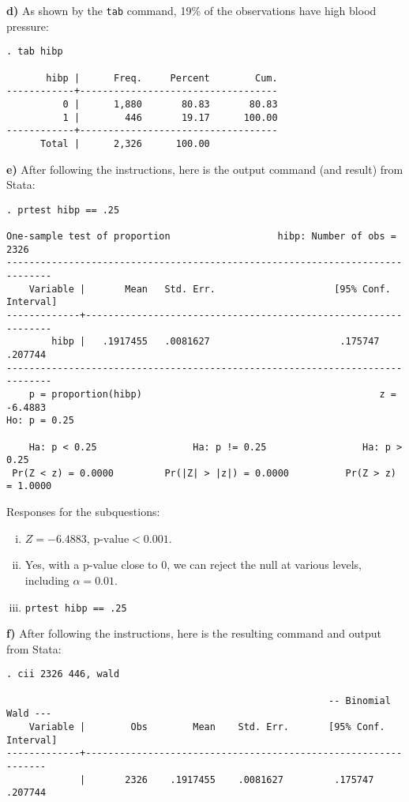 \documentclass{article}
\begin{document}
\textbf{d)} As shown by the \texttt{tab} command, 19\% of the observations have high blood pressure:

\begin{verbatim}
. tab hibp

       hibp |      Freq.     Percent        Cum.
------------+-----------------------------------
          0 |      1,880       80.83       80.83
          1 |        446       19.17      100.00
------------+-----------------------------------
      Total |      2,326      100.00
\end{verbatim}

\textbf{e)} After following the instructions, here is the output command (and result) from Stata:

\begin{verbatim}
. prtest hibp == .25

One-sample test of proportion                   hibp: Number of obs =     2326
------------------------------------------------------------------------------
    Variable |       Mean   Std. Err.                     [95% Conf. Interval]
-------------+----------------------------------------------------------------
        hibp |   .1917455   .0081627                       .175747     .207744
------------------------------------------------------------------------------
    p = proportion(hibp)                                          z =  -6.4883
Ho: p = 0.25

    Ha: p < 0.25                 Ha: p != 0.25                 Ha: p > 0.25
 Pr(Z < z) = 0.0000         Pr(|Z| > |z|) = 0.0000          Pr(Z > z) = 1.0000
\end{verbatim}

Responses for the subquestions:

\begin{enumerate}[i.]
    \item $Z=-6.4883$, $\mbox{p-value}< 0.001$.
    \item Yes, with a p-value close to 0, we can reject the null at various levels, including $\alpha=0.01$.
    \item \texttt{prtest hibp == .25}
\end{enumerate}

\textbf{f)} After following the instructions, here is the resulting command and output from Stata:

\begin{verbatim}
. cii 2326 446, wald

                                                         -- Binomial Wald ---
    Variable |        Obs        Mean    Std. Err.       [95% Conf. Interval]
-------------+---------------------------------------------------------------
             |       2326    .1917455    .0081627         .175747     .207744
\end{verbatim}
\end{document}
